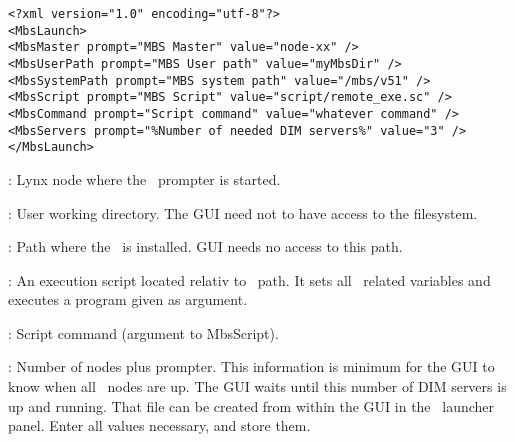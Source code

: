 {\small \begin{verbatim}
<?xml version="1.0" encoding="utf-8"?>
<MbsLaunch>
<MbsMaster prompt="MBS Master" value="node-xx" />
<MbsUserPath prompt="MBS User path" value="myMbsDir" />
<MbsSystemPath prompt="MBS system path" value="/mbs/v51" />
<MbsScript prompt="MBS Script" value="script/remote_exe.sc" />
<MbsCommand prompt="Script command" value="whatever command" />
<MbsServers prompt="%Number of needed DIM servers%" value="3" />
</MbsLaunch>
\end{verbatim}
\bdes
\item[MbsMaster]: Lynx node where the \mbs\ prompter is started.
\item[MbsUserPath]: User working directory. The GUI need not to have
access to the filesystem.
\item[MbsSystemPath]:  Path where the \mbs\ is installed. GUI needs no access to this path.
\item[MbsScript]: An execution script located relativ to \mbs\ path.
It sets all \mbs\ related variables and executes a program given as argument.
\item[MbsCommand]: Script command (argument to MbsScript).
\item[MbsServers]: Number of nodes plus prompter. This information
is minimum for the GUI to know when all \mbs\ nodes are up. The GUI waits until
this number of DIM servers is up and running.
\edes
That file can be created from within the GUI in the \mbs\ launcher panel.
Enter all values necessary, and store them. 
}
